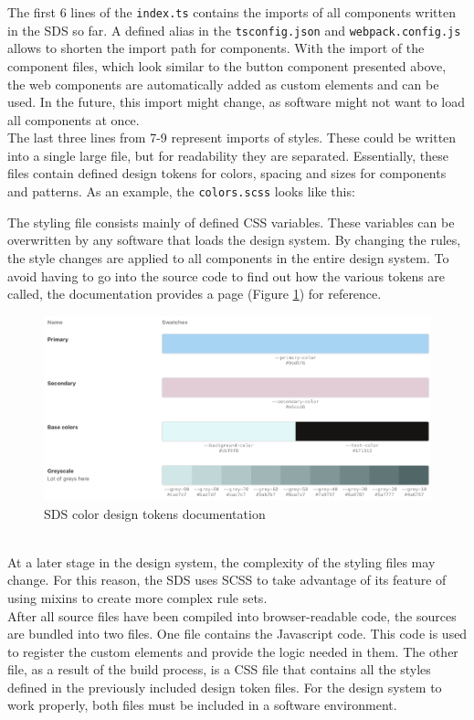 
The first 6 lines of the \texttt{index.ts} contains the imports of all components written in the SDS so far. A defined alias in the \texttt{tsconfig.json} and \texttt{webpack.config.js} allows to shorten the import path for components. With the import of the component files, which look similar to the button component presented above, the web components are automatically added as custom elements and can be used. In the future, this import might change, as software might not want to load all components at once. \\
The last three lines from 7-9 represent imports of styles. These could be written into a single large file, but for readability they are separated. Essentially, these files contain defined design tokens for colors, spacing and sizes for components and patterns. As an example, the \texttt{colors.scss} looks like this:

The styling file consists mainly of defined CSS variables. These variables can be overwritten by any software that loads the design system. By changing the rules, the style changes are applied to all components in the entire design system. To avoid having to go into the source code to find out how the various tokens are called, the documentation provides a page (Figure \ref{sds_color_design_tokens}) for reference.
\begin{figure}[htbp]
    \centerline{\includegraphics[width=\linewidth]{images/color_design_tokens.png}}
    \caption{SDS color design tokens documentation}
    \label{sds_color_design_tokens}
\end{figure} \\
At a later stage in the design system, the complexity of the styling files may change. For this reason, the SDS uses SCSS to take advantage of its feature of using mixins to create more complex rule sets.\citep{scss_sass_nodate} \\
After all source files have been compiled into browser-readable code, the sources are bundled into two files. One file contains the Javascript code. This code is used to register the custom elements and provide the logic needed in them. The other file, as a result of the build process, is a CSS file that contains all the styles defined in the previously included design token files. For the design system to work properly, both files must be included in a software environment. \\

